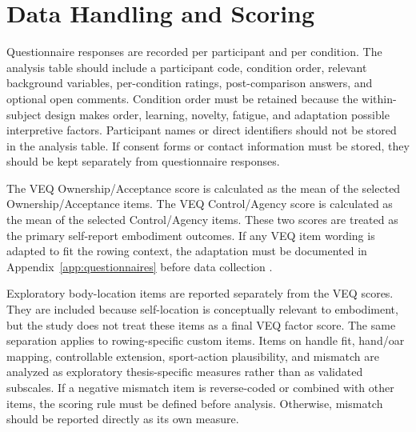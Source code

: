\section{Data Handling and Scoring}
\label{sec:study_design_data_handling}

Questionnaire responses are recorded per participant and per condition.
The analysis table should include a participant code, condition order, relevant background variables, per-condition ratings, post-comparison answers, and optional open comments.
Condition order must be retained because the within-subject design makes order, learning, novelty, fatigue, and adaptation possible interpretive factors.
Participant names or direct identifiers should not be stored in the analysis table.
If consent forms or contact information must be stored, they should be kept separately from questionnaire responses.

The VEQ Ownership/Acceptance score is calculated as the mean of the selected Ownership/Acceptance items.
The VEQ Control/Agency score is calculated as the mean of the selected Control/Agency items.
These two scores are treated as the primary self-report embodiment outcomes.
If any VEQ item wording is adapted to fit the rowing context, the adaptation must be documented in Appendix~\ref{app:questionnaires} before data collection \parencite{rothLatoschik2020veq}.

Exploratory body-location items are reported separately from the VEQ scores.
They are included because self-location is conceptually relevant to embodiment, but the study does not treat these items as a final VEQ factor score.
The same separation applies to rowing-specific custom items.
Items on handle fit, hand/oar mapping, controllable extension, sport-action plausibility, and mismatch are analyzed as exploratory thesis-specific measures rather than as validated subscales.
If a negative mismatch item is reverse-coded or combined with other items, the scoring rule must be defined before analysis.
Otherwise, mismatch should be reported directly as its own measure.

